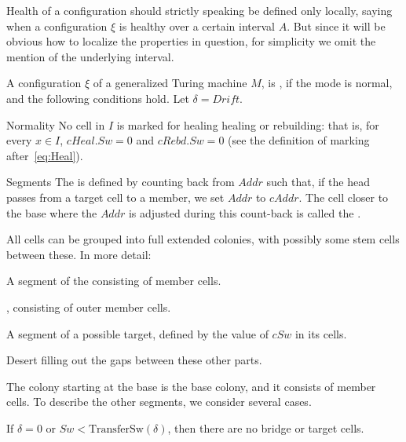 \documentclass[12pt]{memoir}
\newcommand{\fld}[1]{\ensuremath{\textit{#1}}}
\newcommand{\Addr}{\fld{Addr}}
\newcommand{\cAddr}{\fld{cAddr}}
\newcommand{\cRebd}{\fld{cRebd}}
\newcommand{\Drift}{\fld{Drift}}
\newcommand{\cHeal}{\fld{cHeal}}
\newcommand{\Sweep}{\fld{Sw}}
\newcommand{\cSweep}{\fld{cSw}}
\newcommand{\TransferSw}{\mathrm{TransferSw}}
\begin{document}
\begin{definition}\label{def:healthy}
Health of a configuration should strictly speaking be defined only 
locally, saying when a configuration \( \xi \)
is healthy over a certain interval \( A \).
But since it will be obvious how to localize the properties in question,
for simplicity we omit the mention of the underlying interval.

    A configuration \( \xi \) of a generalized Turing machine \( M \),
    is , if the mode is normal, and the following conditions hold.
    Let \( \delta = \Drift \).

\begin{flushdescription}

     \item[Normality]
           No cell in \( I \) is marked for healing healing or rebuilding:
           that is, for every \( x \in I \), \( \cHeal.\Sweep = 0 \) and
           \( \cRebd.\Sweep = 0 \)  (see the definition of marking after~\eqref{eq:Heal}).

\item[Segments]
        The  is defined by counting back from \( \Addr \) such that, if the head
        passes from a target cell to a member, we set \( \Addr \) to \( \cAddr \).
        The cell closer to the base where the \( \Addr \) is adjusted during
        this count-back is called the .

    All cells can be grouped into full extended colonies,
with possibly some stem cells between these.
In more detail:
  \begin{bullets}
  \item A segment of the  consisting of member cells.
  \item {}, consisting of outer member cells.
   \item A segment of a possible target, defined by the value of \( \cSweep \) in its cells.
    \item Desert filling out the gaps between these other parts.
  \end{bullets}

        The colony starting at the base is the base colony, and it consists of member cells.
        To describe the other segments, we consider several cases.
        \begin{bullets}
        \item 
        If \( \delta=0 \) or \( \Sweep < \TransferSw(\delta) \), 
        then there are no bridge or target cells.


\end{bullets}
\end{flushdescription}
\end{definition}
\end{document}
